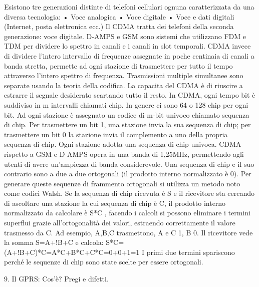 Esistono tre generazioni distinte di telefoni cellulari ognuna caratterizzata da una diversa tecnologia:
•	Voce analogica
•	Voce digitale
•	Voce e dati digitali (Internet, posta elettronica ecc.)
Il CDMA tratta dei telefoni della seconda generazione: voce digitale.
D-AMPS e GSM sono sistemi che utilizzano FDM e TDM per dividere lo spettro in canali e i canali in slot temporali. CDMA invece di dividere l’intero intervallo di frequenze assegnate in poche centinaia di canali a banda stretta, permette ad ogni stazione di trasmettere per tutto il tempo attraverso l’intero spettro di frequenza. Trasmissioni multiple simultanee sono separate usando la teoria della codifica. La capacita del CDMA è di riuscire a estrarre il segnale desiderato scartando tutto il resto.
In CDMA, ogni tempo bit è suddiviso in m intervalli chiamati chip. In genere ci sono 64 o 128 chip per ogni bit. Ad ogni stazione è assegnato un codice di m-bit univoco chiamato sequenza di chip.
Per trasmettere un bit 1, una stazione invia la sua sequenza di chip; per trasmettere un bit 0 la stazione invia il complemento a uno della propria sequenza di chip.
Ogni stazione adotta una sequenza di chip univoca.
CDMA rispetto a GSM e D-AMPS opera in una banda di 1,25MHz, permettendo agli utenti di avere un’ampiezza di banda considerevole.
Una sequenza di chip e il suo contrario sono a due a due ortogonali (il prodotto interno normalizzato è 0). Per generare queste sequenze di frammento ortogonali si utilizza un metodo noto come codici Walsh. 
Se la sequenza di chip ricevuta è S e il ricevitore sta cercando di ascoltare una stazione la cui sequenza di chip è C, il prodotto interno normalizzato da calcolare è S*C , facendo i calcoli si possono eliminare i termini superflui grazie all’ortogonalità dei valori, estraendo correttamente il valore trasmesso da C. 
Ad esempio, A,B,C trasmettono, A e C 1, B 0. Il ricevitore vede la somma S=A+!B+C e calcola:
S*C=(A+!B+C)*C=A*C+B*C+C*C=0+0+1=1
I primi due termini spariscono perché le sequenze di chip sono state scelte per essere ortogonali.

9.	Il GPRS: Cos’è? Pregi e difetti.

